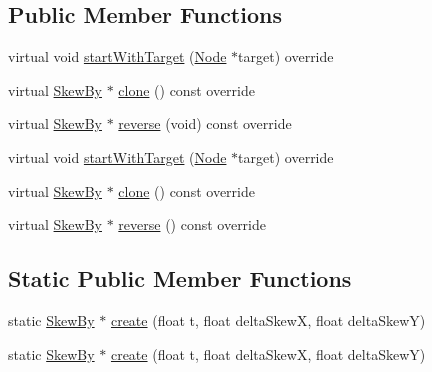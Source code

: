 \subsection*{Public Member Functions}
\begin{DoxyCompactItemize}
\item 
virtual void \hyperlink{classSkewBy_a8f9601dbf00d1a79972bcef59201bd32}{start\+With\+Target} (\hyperlink{classNode}{Node} $\ast$target) override
\item 
virtual \hyperlink{classSkewBy}{Skew\+By} $\ast$ \hyperlink{classSkewBy_ae18e543aa3c28c8365543ae751530aff}{clone} () const override
\item 
virtual \hyperlink{classSkewBy}{Skew\+By} $\ast$ \hyperlink{classSkewBy_ab7828c1588809a605fac2cba100f148d}{reverse} (void) const override
\item 
virtual void \hyperlink{classSkewBy_aaf859fd8f95807064391ebeb6cd9243f}{start\+With\+Target} (\hyperlink{classNode}{Node} $\ast$target) override
\item 
virtual \hyperlink{classSkewBy}{Skew\+By} $\ast$ \hyperlink{classSkewBy_a44399096122f1351b972ee260c667ea0}{clone} () const override
\item 
virtual \hyperlink{classSkewBy}{Skew\+By} $\ast$ \hyperlink{classSkewBy_aab134941d72a83d6249553e8e772da35}{reverse} () const override
\end{DoxyCompactItemize}
\subsection*{Static Public Member Functions}
\begin{DoxyCompactItemize}
\item 
static \hyperlink{classSkewBy}{Skew\+By} $\ast$ \hyperlink{classSkewBy_a184b1383d0366ae24f5afa4602691d1e}{create} (float t, float delta\+SkewX, float delta\+SkewY)
\item 
static \hyperlink{classSkewBy}{Skew\+By} $\ast$ \hyperlink{classSkewBy_a392c3cad5dcf55d244d789cfd614a52d}{create} (float t, float delta\+SkewX, float delta\+SkewY)
\end{DoxyCompactItemize}
